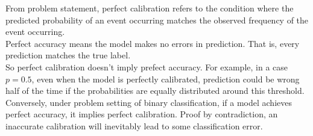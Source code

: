 \begin{answer}

From problem statement, perfect calibration refers to the condition where the predicted probability of an event occurring matches the observed frequency of the event occurring. \\

Perfect accuracy means the model makes no errors in prediction. That is, every prediction matches the true label. \\

So perfect calibration doesn't imply prefect accuracy. For example, in a case $p = 0.5$, even when the model is perfectly calibrated, prediction could be wrong half of the time if the probabilities are equally distributed around this threshold. \\

Conversely, under problem setting of binary classification, if a model achieves perfect accuracy, it implies perfect calibration. Proof by contradiction, an inaccurate calibration will inevitably lead to some classification error.



\end{answer}
